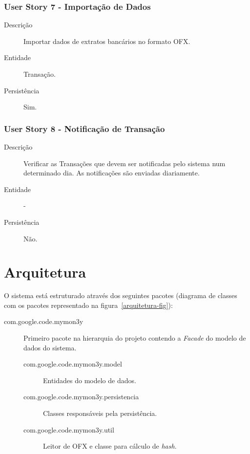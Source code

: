 \documentclass[12pt]{article}
\begin{document}
\subsubsection{User Story 7 - Importação de Dados}

\begin{description}
 \item [Descrição] Importar dados de extratos bancários no formato OFX. 
 \item [Entidade] Transação.
 \item [Persistência] Sim.
\end{description}

\subsubsection{User Story 8 - Notificação de Transação}

\begin{description}
 \item [Descrição] Verificar as Transações que devem ser notificadas pelo sistema num determinado dia. As notificações são enviadas diariamente.
 \item [Entidade] -
 \item [Persistência] Não.
\end{description}

\section{Arquitetura}
\label{arquitetura}

O sistema está estruturado através dos seguintes pacotes (diagrama de classes com os pacotes representado na figura~\ref{arquitetura-fig}):

\begin{description}
 \item [com.google.code.mymon3y] Primeiro pacote na hierarquia do projeto contendo a \textit{Facade} do modelo de dados do sistema.
 \begin{description}
     \item [com.google.code.mymon3y.model] Entidades do modelo de dados.
     \item [com.google.code.mymon3y.persistencia] Classes responsáveis pela persistência.
     \item [com.google.code.mymon3y.util] Leitor de OFX e classe para cálculo
     de \textit{hash}.
 \end{description}
\end{description}
\end{document}
